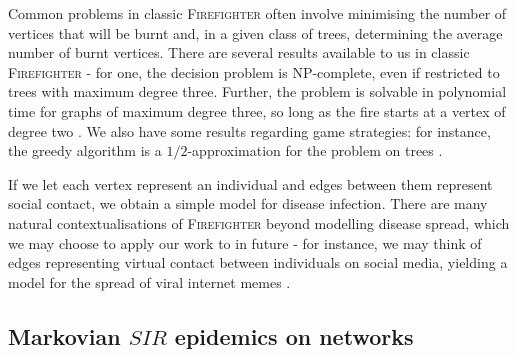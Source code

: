 \documentclass[../report.tex]{subfiles}
\begin{document}
\begin{center}
\noindent{}%
\end{center}

Common problems in classic {\scshape Firefighter} often involve minimising the number of vertices that will be burnt and, in a given class of trees, determining the average number of burnt vertices. There are several results available to us in classic {\scshape Firefighter} - for one, the decision problem is NP-complete, even if restricted to trees with maximum degree three. Further, the problem is solvable in polynomial time for graphs of maximum degree three, so long as the fire starts at a vertex of degree two \cite{finbow_2009}. We also have some results regarding game strategies: for instance, the greedy algorithm is a $1/2$-approximation for the problem on trees \cite{finbow_2009}.

If we let each vertex represent an individual and edges between them represent social contact, we obtain a simple model for disease infection. There are many natural contextualisations of {\scshape Firefighter} beyond modelling disease spread, which we may choose to apply our work to in future - for instance, we may think of edges representing virtual contact between individuals on social media, yielding a model for the spread of viral internet memes \cite{obrien_2019}.


\subsection{Markovian $SIR$ epidemics on networks}
\label{subsec:SIR-lit}
\end{document}
